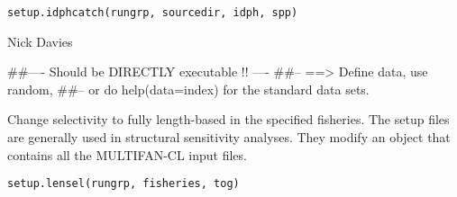 \documentclass[a4paper]{book}
\begin{document}
%
\begin{Usage}
\begin{verbatim}
setup.idphcatch(rungrp, sourcedir, idph, spp)
\end{verbatim}
\end{Usage}
%
\begin{Arguments}
\begin{ldescription}
\item[\code{rungrp}] 


\item[\code{sourcedir}] 


\item[\code{idph}] 


\item[\code{spp}] 


\end{ldescription}
\end{Arguments}
%
\begin{Author}\relax

Nick Davies
\end{Author}
%
\begin{Examples}
\begin{ExampleCode}
##---- Should be DIRECTLY executable !! ----
##-- ==>  Define data, use random,
##--	or do  help(data=index)  for the standard data sets.

\end{ExampleCode}
\end{Examples}
%
\begin{Description}\relax

Change selectivity to fully length-based in the specified fisheries. 
The setup files are generally used in structural sensitivity analyses. They modify an object that contains all the MULTIFAN-CL input files. 
\end{Description}
%
\begin{Usage}
\begin{verbatim}
setup.lensel(rungrp, fisheries, tog)
\end{verbatim}
\end{Usage}
%
\begin{Arguments}
\begin{ldescription}
\item[\code{rungrp}] 


\item[\code{fisheries}] 


\item[\code{tog}] 


\end{ldescription}
\end{Arguments}
\end{document}
